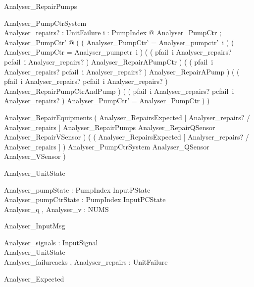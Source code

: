 \documentclass{article}
\begin{document}
\begin{schema}{Analyser\_RepairPumps}

 \Delta Analyser\_PumpCtrSystem \\
 Analyser\_repairs? : \power UnitFailure 
\where
 \forall i : PumpIndex @ \exists Analyser\_PumpCtr ; Analyser\_PumpCtr' @ ( ( \theta Analyser\_PumpCtr' = Analyser\_pumpctr'~i ) \land ( \theta Analyser\_PumpCtr = Analyser\_pumpctr~i ) \land ( ( pfail~i \in Analyser\_repairs? \land pcfail~i \notin Analyser\_repairs? ) \implies Analyser\_RepairAPumpCtr ) \land ( ( pfail~i \notin Analyser\_repairs? \land pcfail~i \in Analyser\_repairs? ) \implies Analyser\_RepairAPump ) \land ( ( pfail~i \in Analyser\_repairs? \land pcfail~i \in Analyser\_repairs? ) \implies Analyser\_RepairPumpCtrAndPump ) \land ( ( pfail~i \notin Analyser\_repairs? \land pcfail~i \notin Analyser\_repairs? ) \implies \theta Analyser\_PumpCtr' = \theta Analyser\_PumpCtr ) )
\end{schema}

\begin{zed}
	Analyser\_RepairEquipments  ( Analyser\_RepairsExpected [ Analyser\_repairs? / Analyser\_repairs ] \land Analyser\_RepairPumps \land Analyser\_RepairQSensor \land Analyser\_RepairVSensor ) \lor ( ( \lnot Analyser\_RepairsExpected [ Analyser\_repairs? / Analyser\_repairs ] ) \land \Xi Analyser\_PumpCtrSystem \land \Xi Analyser\_QSensor \land \Xi Analyser\_VSensor )
\end{zed}

\begin{schema}{Analyser\_UnitState}

 Analyser\_pumpState : PumpIndex \fun InputPState \\
 Analyser\_pumpCtrState : PumpIndex \fun InputPCState \\
 Analyser\_q , Analyser\_v : NUMS
\end{schema}

\begin{schema}{Analyser\_InputMsg}

 Analyser\_signals : \power InputSignal \\
 Analyser\_UnitState \\
 Analyser\_failureacks , Analyser\_repairs : \power UnitFailure
\end{schema}

\begin{zed}
	Analyser\_Expected 
\end{zed}
\end{document}
